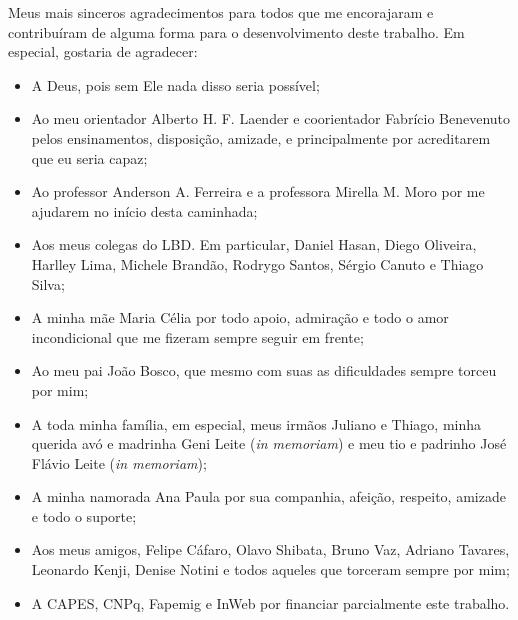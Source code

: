 Meus mais sinceros agradecimentos para todos que me encorajaram e contribuíram 
de alguma forma para o desenvolvimento deste trabalho. Em especial, gostaria de agradecer:
\begin{itemize}
 \item A Deus, pois sem Ele nada disso seria possível;
 \item Ao meu orientador Alberto H. F. Laender e coorientador Fabrício Benevenuto pelos ensinamentos,
       disposição, amizade, e principalmente por acreditarem que eu seria capaz;
 \item Ao professor Anderson A. Ferreira e a professora Mirella M. Moro por me ajudarem no início desta
       caminhada;
 \item Aos meus colegas do LBD. Em particular, Daniel Hasan, Diego Oliveira, Harlley Lima, Michele Brandão, 
       Rodrygo Santos, Sérgio Canuto e Thiago Silva;
 \item A minha mãe Maria Célia por todo apoio, admiração e todo o amor incondicional que me fizeram sempre 
       seguir em frente;
 \item Ao meu pai João Bosco, que mesmo com suas as dificuldades sempre torceu por mim;
 \item A toda minha família, em especial, meus irmãos Juliano e Thiago, minha querida avó e madrinha 
       Geni Leite (\textit{in memoriam}) e meu tio e padrinho José Flávio Leite (\textit{in memoriam});
 \item A minha namorada Ana Paula por sua companhia, afeição, respeito, amizade e todo o suporte;
 \item Aos meus amigos, Felipe Cáfaro, Olavo Shibata, Bruno Vaz, Adriano Tavares, Leonardo Kenji, 
       Denise Notini e todos aqueles que torceram sempre por mim;
 \item A CAPES, CNPq, Fapemig e InWeb por financiar parcialmente este trabalho.
\end{itemize}

